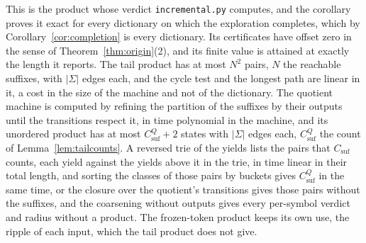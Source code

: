 \documentclass[11pt,a4paper]{article}
\theoremstyle{definition}
\theoremstyle{plain}
\newcommand{\code}[1]{\texttt{#1}}
\begin{document}
This is the product whose verdict \code{incremental.py} computes, and the corollary proves it exact for every dictionary
on which the exploration completes, which by Corollary~\ref{cor:completion} is every dictionary. Its certificates have
offset zero in the sense of Theorem~\ref{thm:origin}(2), and its finite value is attained at exactly the length it
reports. The tail product has at most \(N^2\) pairs, \(N\) the reachable suffixes, with \(|\Sigma|\) edges each, and the
cycle test and the longest path are linear in it, a cost in the size of the machine and not of the dictionary. The
quotient machine is computed by refining the partition of the suffixes by their outputs until the transitions respect
it, in time polynomial in the machine, and its unordered product has at most \(C^{Q}_{\mathrm{suf}} + 2\) states with
\(|\Sigma|\) edges each, \(C^{Q}_{\mathrm{suf}}\) the count of Lemma~\ref{lem:tailcounts}. A reversed trie of the yields
lists the pairs that \(C_{\mathrm{suf}}\) counts, each yield against the yields above it in the trie, in time linear in
their total length, and sorting the classes of those pairs by buckets gives \(C^{Q}_{\mathrm{suf}}\) in the same time,
or the closure over the quotient's transitions gives those pairs without the suffixes, and the coarsening without
outputs gives every per-symbol verdict and radius without a product. The frozen-token product keeps its own use, the
ripple of each input, which the tail product does not give.

\end{document}
